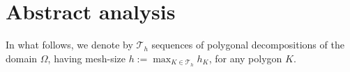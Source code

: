 \documentclass[smallextended]{svjour3}
\numberwithin{equation}{section}
\numberwithin{figure}{section}
\numberwithin{table}{section}
\newcommand\bV{\mathbf{V}}
\newcommand\bu{\boldsymbol{u}}
\newcommand\bv{\boldsymbol{v}}
\newcommand\bz{\boldsymbol{z}}
\newcommand\cT{\mathcal{T}}
\begin{document}
	
	
	
	
	\section{Abstract analysis} \label{sec:abstract}
	
	In what follows, we denote by  ${\mathcal T}_h$ sequences of polygonal decompositions of the domain $\Omega$,
    having mesh-size $h:=\max_{K\in{\mathcal T}_h}h_K$, for any polygon $K$.
	
\end{document}
